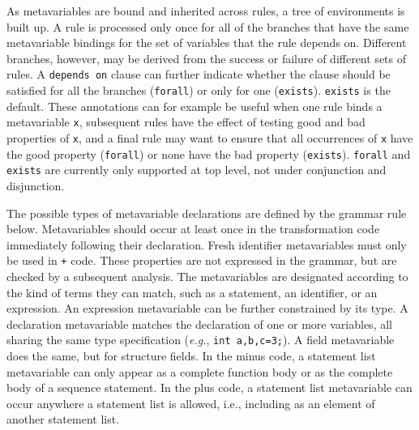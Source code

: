 As metavariables are bound and inherited across rules, a tree of
environments is built up.  A rule is processed only once for all of the
branches that have the same metavariable bindings for the set of variables
that the rule depends on.  Different branches, however, may be derived from
the success or failure of different sets of rules.  A \texttt{depends on}
clause can further indicate whether the clause should be satisfied for all
the branches (\texttt{forall}) or only for one (\texttt{exists}).
\texttt{exists} is the default.  These annotations can for example be
useful when one rule binds a metavariable \texttt{x}, subsequent rules have
the effect of testing good and bad properties of \texttt{x}, and a final
rule may want to ensure that all occurrences of \texttt{x} have the good
property (\texttt{forall}) or none have the bad property
(\texttt{exists}).  \texttt{forall} and \texttt{exists} are currently only
supported at top level, not under conjunction and disjunction.


The possible types of metavariable declarations are defined by the grammar
rule below.  Metavariables should occur at least once in the transformation
code immediately following their declaration.  Fresh identifier
metavariables must only be used in {\tt +} code.  These properties are not
expressed in the grammar, but are checked by a subsequent analysis.  The
metavariables are designated according to the kind of terms they can match,
such as a statement, an identifier, or an expression.  An expression
metavariable can be further constrained by its type.  A declaration
metavariable matches the declaration of one or more variables, all sharing
the same type specification ({\em e.g.}, {\tt int a,b,c=3;}).  A field
metavariable does the same, but for structure fields.  In the minus code, a
statement list metavariable can only appear as a complete function body or
as the complete body of a sequence statement.  In the plus code, a
statement list metavariable can occur anywhere a statement list is allowed,
i.e., including as an element of another statement list.


